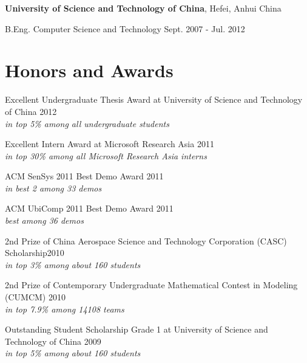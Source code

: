 \documentclass[margin,line]{res}
\newenvironment{list1}{
  \begin{list}{\ding{113}}{
      \setlength{\itemsep}{0in}
      \setlength{\parsep}{0in} \setlength{\parskip}{0in}
      \setlength{\topsep}{0in} \setlength{\partopsep}{0in}
      \setlength{\leftmargin}{0.17in}}}{\end{list}}
\begin{document}
\begin{resume}
      \vspace*{-2.5mm}
      {\bf University of Science and Technology of China}, Hefei, Anhui China \\
      \vspace*{-.1in}
      \begin{list1}
        \item[] B.Eng. Computer Science and Technology \hfill Sept. 2007 - Jul. 2012 \\
      \end{list1}


    \section{\sc Honors and Awards}

      Excellent Undergraduate Thesis Award at University of Science and Technology of China \hfill 2012\\
      {\it in top 5\% among all undergraduate students}

      \vspace*{-2.5mm}
      Excellent Intern Award at Microsoft Research Asia \hfill 2011\\
      {\it in top 30\% among all Microsoft Research Asia interns}

      \vspace*{-2.5mm}
      ACM SenSys 2011 Best Demo Award \hfill 2011\\
      {\it in best 2 among 33 demos}

      \vspace*{-2.5mm}
      ACM UbiComp 2011 Best Demo Award \hfill 2011\\
      {\it best among 36 demos}

      \vspace*{-2.5mm}
      2nd Prize of China Aerospace Science and Technology Corporation (CASC) Scholarship\hfill 2010\\
      {\it in top 3\% among about 160 students}

      \vspace*{-2.5mm}
      2nd Prize of Contemporary Undergraduate Mathematical Contest in Modeling (CUMCM) \hfill 2010\\
      {\it in top 7.9\% among 14108 teams}

      \vspace*{-2.5mm}
      Outstanding Student Scholarship Grade 1 at University of Science and Technology of China \hfill 2009\\
      {\it in top 5\% among about 160 students}


\end{resume}
\end{document}

